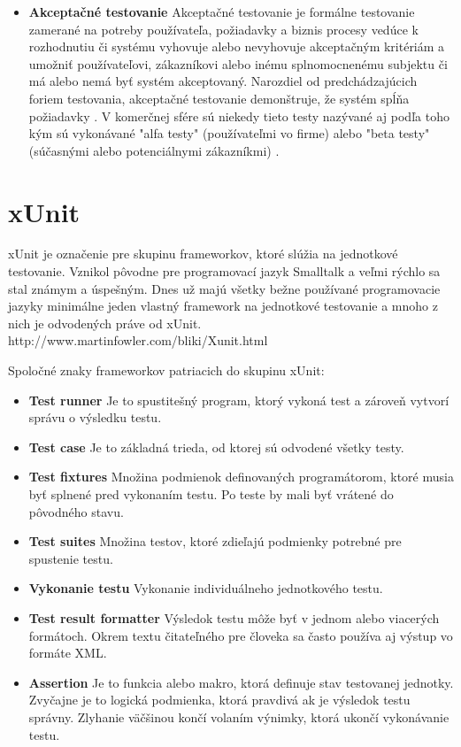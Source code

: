 \documentclass[11pt,twoside,slovak,a4paper]{article}
\begin{document}
\begin{itemize}
		\item \textbf{Akceptačné testovanie} \newline		
			Akceptačné testovanie je formálne testovanie zamerané na potreby používateľa, požiadavky a  biznis procesy vedúce k rozhodnutiu či systému vyhovuje alebo nevyhovuje akceptačným kritériám a umožniť používateľovi, zákazníkovi alebo inému splnomocnenému subjektu či má alebo nemá byť systém akceptovaný\cite{Veenendaal2010}. \newline
			Narozdiel od predchádzajúcich foriem testovania, akceptačné testovanie demonštruje, že systém spĺňa požiadavky \cite{Alba2008}. \newline
			V komerčnej sfére sú niekedy tieto testy nazývané aj podľa toho kým sú vykonávané "alfa testy" (používateľmi vo firme) alebo "beta testy" (súčasnými alebo potenciálnymi zákazníkmi) \cite{Alba2008}.
	\end{itemize}
	
	\section{xUnit}
		xUnit je označenie pre skupinu frameworkov, ktoré slúžia na jednotkové testovanie. Vznikol pôvodne pre programovací jazyk Smalltalk a veľmi rýchlo sa stal známym a úspešným. Dnes už majú všetky bežne používané programovacie jazyky minimálne jeden vlastný framework na jednotkové testovanie a mnoho z nich je odvodených práve od xUnit. 		http://www.martinfowler.com/bliki/Xunit.html \newline

		Spoločné znaky frameworkov patriacich do skupinu xUnit:
		\begin{itemize}
			\item \textbf{Test runner} Je to spustitešný program, ktorý vykoná test a zároveň vytvorí správu o výsledku testu.
			\item \textbf{Test case} Je to základná trieda, od ktorej sú odvodené všetky testy.
			\item \textbf{Test fixtures} Množina podmienok definovaných programátorom, ktoré musia byť splnené pred vykonaním testu. Po teste by mali byť vrátené do pôvodného stavu.
			\item \textbf{Test suites} Množina testov, ktoré zdieľajú podmienky potrebné pre spustenie testu.
			\item \textbf{Vykonanie testu} Vykonanie individuálneho jednotkového testu.
			\item \textbf{Test result formatter} Výsledok testu môže byť v jednom alebo viacerých formátoch. Okrem textu čitateľného pre človeka sa často používa aj výstup vo formáte XML.
			\item \textbf{Assertion} Je to funkcia alebo makro, ktorá definuje stav testovanej jednotky. Zvyčajne je to logická podmienka, ktorá pravdivá ak je výsledok testu správny. Zlyhanie väčšinou končí volaním výnimky, ktorá ukončí vykonávanie testu.
		\end{itemize}
		
\end{document}
